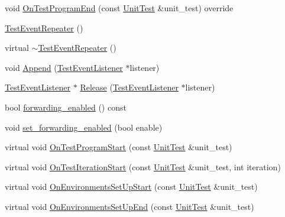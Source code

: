 \begin{DoxyCompactItemize}
\item 
void \mbox{\hyperlink{classtesting_1_1internal_1_1_test_event_repeater_a255378258ea0d14688303d4a6421746f}{On\+Test\+Program\+End}} (const \mbox{\hyperlink{classtesting_1_1_unit_test}{Unit\+Test}} \&unit\+\_\+test) override
\item 
\mbox{\hyperlink{classtesting_1_1internal_1_1_test_event_repeater_a97dc3b08bd62c615f16e4c73ed0b3894}{Test\+Event\+Repeater}} ()
\item 
virtual \mbox{\hyperlink{classtesting_1_1internal_1_1_test_event_repeater_abec83146387ab79e0e14df2850f25ee3}{$\sim$\+Test\+Event\+Repeater}} ()
\item 
void \mbox{\hyperlink{classtesting_1_1internal_1_1_test_event_repeater_ad154ce021881721a5c46994316b14cb1}{Append}} (\mbox{\hyperlink{classtesting_1_1_test_event_listener}{Test\+Event\+Listener}} $\ast$listener)
\item 
\mbox{\hyperlink{classtesting_1_1_test_event_listener}{Test\+Event\+Listener}} $\ast$ \mbox{\hyperlink{classtesting_1_1internal_1_1_test_event_repeater_a6aae8ac4eb3d9aa655f2ba71673dfd06}{Release}} (\mbox{\hyperlink{classtesting_1_1_test_event_listener}{Test\+Event\+Listener}} $\ast$listener)
\item 
bool \mbox{\hyperlink{classtesting_1_1internal_1_1_test_event_repeater_abaf2bfc453fc0e1005fcfb0f95deac4c}{forwarding\+\_\+enabled}} () const
\item 
void \mbox{\hyperlink{classtesting_1_1internal_1_1_test_event_repeater_a86c52e311b70598a385a0589277e92e0}{set\+\_\+forwarding\+\_\+enabled}} (bool enable)
\item 
virtual void \mbox{\hyperlink{classtesting_1_1internal_1_1_test_event_repeater_a15ee2ff051063088d3a89a266d5ffcc4}{On\+Test\+Program\+Start}} (const \mbox{\hyperlink{classtesting_1_1_unit_test}{Unit\+Test}} \&unit\+\_\+test)
\item 
virtual void \mbox{\hyperlink{classtesting_1_1internal_1_1_test_event_repeater_a287bfe702e3aa2dfd95106592935ba8f}{On\+Test\+Iteration\+Start}} (const \mbox{\hyperlink{classtesting_1_1_unit_test}{Unit\+Test}} \&unit\+\_\+test, int iteration)
\item 
virtual void \mbox{\hyperlink{classtesting_1_1internal_1_1_test_event_repeater_ae71819925adec0471fa7abc5072b8244}{On\+Environments\+Set\+Up\+Start}} (const \mbox{\hyperlink{classtesting_1_1_unit_test}{Unit\+Test}} \&unit\+\_\+test)
\item 
virtual void \mbox{\hyperlink{classtesting_1_1internal_1_1_test_event_repeater_a3a92696df942dc92f985e52fddd6d303}{On\+Environments\+Set\+Up\+End}} (const \mbox{\hyperlink{classtesting_1_1_unit_test}{Unit\+Test}} \&unit\+\_\+test)

\end{DoxyCompactItemize}
